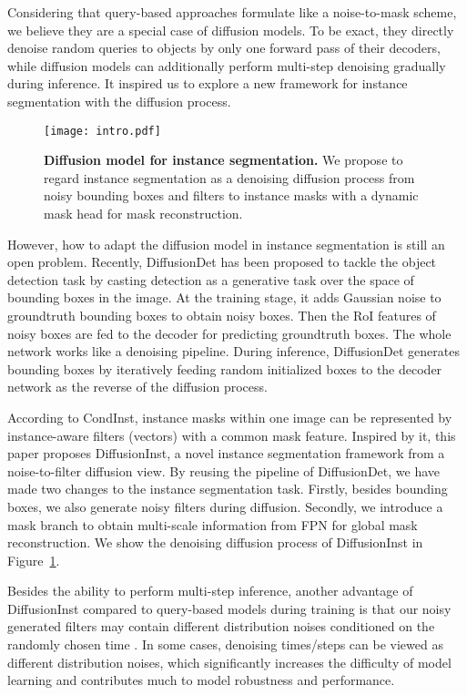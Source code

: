 \documentclass{article}
\begin{document}
Considering that query-based approaches\cite{Mask2Former,QueryInst} formulate like a noise-to-mask scheme, we believe they are a special case of diffusion models\cite{DDPM,SGM,GMDD}. To be exact, they directly denoise random queries to objects by only one forward pass of their decoders, while diffusion models can additionally perform multi-step denoising gradually during inference. It inspired us to explore a new framework for instance segmentation with the diffusion process.

\begin{figure}[t]
\centering
\texttt{[image: intro.pdf]}
\caption{\textbf{Diffusion model for instance segmentation.} We propose to regard instance segmentation as a denoising diffusion process from noisy 
bounding boxes and filters to instance masks with a dynamic mask head for mask reconstruction.}
\label{intro}
\end{figure}

However, how to adapt the diffusion model in instance segmentation is still an open problem. Recently, DiffusionDet\cite{DiffusionDet} has been proposed to tackle the object detection task by casting detection as a generative task over the space of bounding boxes in the image. At the training stage, it adds Gaussian noise to groundtruth bounding boxes to obtain noisy boxes. Then the RoI features of noisy boxes are fed to the decoder for predicting groundtruth boxes. The whole network works like a denoising pipeline. During inference, DiffusionDet generates bounding boxes by iteratively feeding random initialized boxes to the decoder network as the reverse of the diffusion process. 

According to CondInst\cite{CondInst}, instance masks within one image can be represented by instance-aware filters (vectors) with a common mask feature. Inspired by it, this paper proposes DiffusionInst, a novel instance segmentation framework from a noise-to-filter diffusion view. By reusing the pipeline of DiffusionDet, we have made two changes to the instance segmentation task. Firstly, besides bounding boxes, we also generate noisy filters during diffusion. Secondly, we introduce a mask branch to obtain multi-scale information from FPN\cite{FPN} for global mask reconstruction. We show the denoising diffusion process of DiffusionInst in Figure~\ref{intro}.

Besides the ability to perform multi-step inference, another advantage of DiffusionInst compared to query-based models during training is that our noisy generated filters may contain different distribution noises conditioned on the randomly chosen time . In some cases,  denoising times/steps can be viewed as  different distribution noises, which significantly increases the difficulty of model learning and contributes much to model robustness and performance. 
\end{document}
